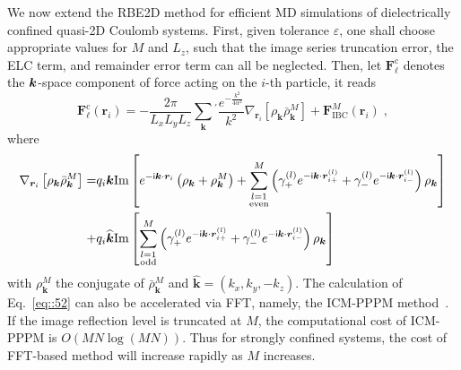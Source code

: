 We now extend the RBE2D method for efficient MD simulations of dielectrically confined quasi-2D Coulomb systems. 
First, given tolerance $\varepsilon$, one shall choose appropriate values for $M$ and $L_z$, such that the image series truncation error, the ELC term, and remainder error term can all be neglected. Then, let $\bm{F}_{\ell}^{\text{c}}$ denotes the $\boldsymbol{k}$-space component of force acting on the $i$-th particle, it reads
\begin{equation}\label{eq::52}
\bm{F}_{\ell}^{\text{c}}(\bm{r}_i)=-\frac{2\pi}{L_xL_yL_z}\sum_{\bm{k}}{}^{\prime}\frac{e^{-\frac{k^2}{4\alpha^2}}}{k^2}\nabla_{\bm{r}_i}\left[\rho_{\bm{k}}\bar{\rho}_{\bm{k}}^{M}\right]+\bm{F}_{\text{IBC}}^{M}(\bm{r}_i)\;,%
\end{equation}
where 
\begin{equation}\label{eq::rhorhoM}
\begin{split}
\nabla_{\bm{r}_i}\left[\rho_{\bm{k}}\bar{\rho}_{\bm{k}}^{M}\right]=&q_i\bm{k}\text{Im}\left[e^{-\mathsf i\bm{k}\cdot\bm{r}_i}\left(\rho_{\bm{k}}+\rho_{\bm{k}}^{M}\right)+\sum_{\substack{l=1\\ \text{even}}}^{M}\left(\gamma_{+}^{(l)}e^{-\mathsf i\bm{k}\cdot\bm{r}_{i+}^{(l)}}+\gamma_{-}^{(l)}e^{-\mathsf i\bm{k}\cdot\bm{r}_{i-}^{(l)}}\right)\rho_{\bm{k}}\right]\\
+&q_i\widehat{\bm{k}}\text{Im}\left[\sum_{\substack{l=1\\ \text{odd}}}^{M}\left(\gamma_{+}^{(l)}e^{-\mathsf i\bm{k}\cdot\bm{r}_{i+}^{(l)}}+\gamma_{-}^{(l)}e^{-\mathsf i\bm{k}\cdot\bm{r}_{i-}^{(l)}}\right)\rho_{\bm{k}}\right]
\end{split}
\end{equation}
with $\rho_{\bm{k}}^{M}$ the conjugate of $\bar{\rho}_{\bm{k}}^{M}$ and $\widehat{\bm{k}}=(k_x,k_y,-k_z)$. The calculation of Eq.~\eqref{eq::52} can also be accelerated via FFT, namely, the ICM-PPPM method~\cite{yuan2021particle}. 
If the image reflection level is truncated at $M$, the computational cost of ICM-PPPM is $O(MN \log(MN))$. Thus for strongly confined systems, the cost of FFT-based method will increase rapidly as $M$ increases.

